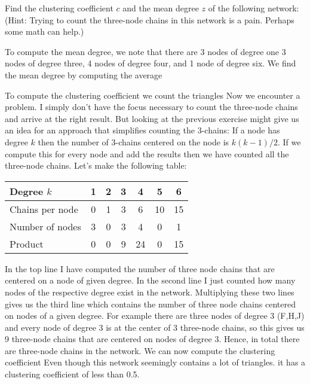 
Find the clustering coefficient $c$ and the mean degree $z$ of the following network:
(Hint: Trying to count the three-node chains in this network is a pain. Perhaps some math can help.)

\solution
To compute the mean degree, we note that there are 3 nodes of degree one 3 nodes of degree three, 4 nodes of degree four, and 1 node of degree six. We find the mean degree by computing the average

To compute the clustering coefficient we count the triangles
Now we encounter a problem. I simply don't have the focus necessary to count the three-node chains and arrive at the right result. But looking at the previous exercise might give us an idea for an approach that simplifies counting the 3-chains: If a node has degree $k$ then the number of 3-chains centered on the node is $k(k-1)/2$. If we compute this for every node and add the results then we have counted all the three-node chains. Let's make the following table: 
\begin{center}
\begin{tabular}{l | c  c  c  c  c  c}
Degree $k$ & 1 & 2 & 3 & 4 & 5 & 6 \\\hline
Chains per node & 0 & 1 & 3 & 6 & 10 & 15 \\
Number of nodes & 3 & 0 & 3 & 4 & 0 & 1  \\
Product         & 0 & 0 & 9 & 24 & 0 & 15 
\end{tabular}    
\end{center}
In the top line I have computed the number of three node chains that are centered on a node of given degree. In the second line I just counted how many nodes of the respective degree exist in the network. Multiplying these two lines gives us the third line which contains the number of three node chains centered on nodes of a given degree. 
For example there are three nodes of degree 3 (F,H,J) and every node of degree 3 is at the center of 3 three-node chains, so this gives us 9 three-node chains that are centered on nodes of degree 3. Hence, in total there are 
three-node chains in the network. We can now compute the clustering coefficient 
Even though this network seemingly contains a lot of triangles. it has a clustering coefficient of less than 0.5. 
